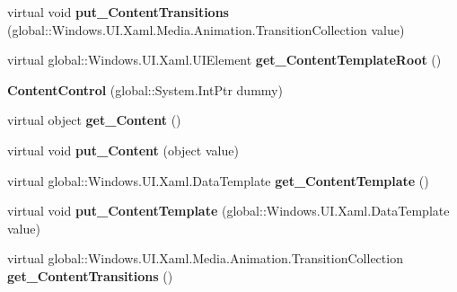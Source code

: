 \begin{DoxyCompactItemize}
virtual void {\bfseries put\+\_\+\+Content\+Transitions} (global\+::\+Windows.\+U\+I.\+Xaml.\+Media.\+Animation.\+Transition\+Collection value)
\item 
\mbox{\label{class_windows_1_1_u_i_1_1_xaml_1_1_controls_1_1_content_control_a1b8d96eef56757cec1eb123b64b62fe4}} 
virtual global\+::\+Windows.\+U\+I.\+Xaml.\+U\+I\+Element {\bfseries get\+\_\+\+Content\+Template\+Root} ()
\item 
\mbox{\label{class_windows_1_1_u_i_1_1_xaml_1_1_controls_1_1_content_control_a54ac07e93dd29c05ab129eb11a433a57}} 
{\bfseries Content\+Control} (global\+::\+System.\+Int\+Ptr dummy)
\item 
\mbox{\label{class_windows_1_1_u_i_1_1_xaml_1_1_controls_1_1_content_control_a1398a502667d7adf98f72f4ae5c485c9}} 
virtual object {\bfseries get\+\_\+\+Content} ()
\item 
\mbox{\label{class_windows_1_1_u_i_1_1_xaml_1_1_controls_1_1_content_control_ac840a1532f5f739ccb323a723b58454b}} 
virtual void {\bfseries put\+\_\+\+Content} (object value)
\item 
\mbox{\label{class_windows_1_1_u_i_1_1_xaml_1_1_controls_1_1_content_control_a5cc3b93bc15a1c9c0ed277ec8dc6dfe9}} 
virtual global\+::\+Windows.\+U\+I.\+Xaml.\+Data\+Template {\bfseries get\+\_\+\+Content\+Template} ()
\item 
\mbox{\label{class_windows_1_1_u_i_1_1_xaml_1_1_controls_1_1_content_control_ab0e5c4f7859f68ed01991a8e932e4bda}} 
virtual void {\bfseries put\+\_\+\+Content\+Template} (global\+::\+Windows.\+U\+I.\+Xaml.\+Data\+Template value)
\item 
\mbox{\label{class_windows_1_1_u_i_1_1_xaml_1_1_controls_1_1_content_control_a074c0bbf88ba02121501aea5d840d64f}} 
virtual global\+::\+Windows.\+U\+I.\+Xaml.\+Media.\+Animation.\+Transition\+Collection {\bfseries get\+\_\+\+Content\+Transitions} ()

\end{DoxyCompactItemize}

